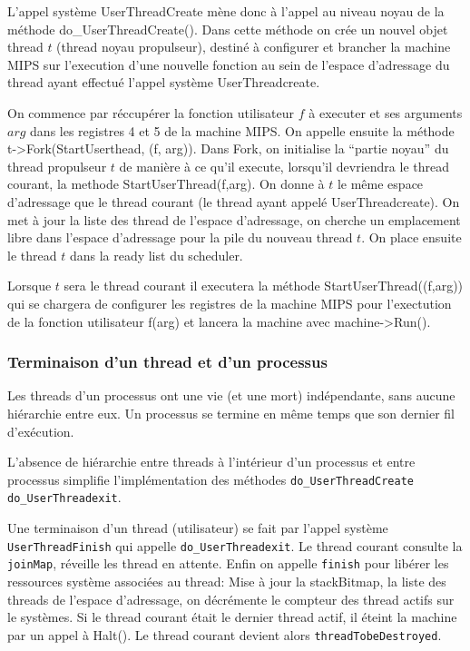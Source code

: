 \documentclass[11pt]{article}
\begin{document}
L'appel système UserThreadCreate mène donc à l'appel au niveau noyau de la méthode do_UserThreadCreate(). Dans cette méthode on crée un nouvel objet thread $t$ (thread noyau propulseur), destiné à configurer et brancher la machine MIPS sur l'execution d'une nouvelle fonction au sein de l'espace d'adressage du thread ayant effectué l'appel système UserThreadcreate.

On commence par réccupérer la fonction utilisateur $f$ à executer et ses arguments $arg$ dans les registres 4 et 5 de la machine MIPS.
On appelle ensuite la méthode t->Fork(StartUserthead, (f, arg)).
Dans Fork, on initialise la ``partie noyau'' du thread propulseur $t$ de manière
à ce qu'il execute, lorsqu'il devriendra le thread courant, la methode
StartUserThread(f,arg). On donne à $t$ le même espace d'adressage que le
thread courant (le thread ayant appelé UserThreadcreate). On met à jour
la liste des thread de l'espace d'adressage, on cherche un emplacement
libre dans l'espace d'adressage pour la pile du nouveau thread $t$.
On place ensuite le thread $t$ dans la ready list du scheduler.

Lorsque $t$ sera le thread courant il executera la méthode StartUserThread((f,arg))
qui se chargera de configurer les registres de la machine MIPS pour l'exectution
de la fonction utilisateur f(arg) et lancera la machine avec machine->Run(). 


\subsubsection{Terminaison d'un thread et d'un processus}
Les threads d'un processus ont une vie (et une mort) indépendante, sans aucune hiérarchie entre eux.
Un processus se termine en même temps que son dernier fil d'exécution.

L'absence de hiérarchie entre threads à l'intérieur d'un processus et entre processus simplifie
l'implémentation des méthodes \texttt{do\_UserThreadCreate} \texttt{do\_UserThreadexit}.

Une terminaison d'un thread (utilisateur) se fait par l'appel système \texttt{UserThreadFinish} qui appelle \texttt{do\_UserThreadexit}. Le thread courant consulte la \texttt{joinMap}, réveille les thread en attente. Enfin on appelle \texttt{finish} pour libérer les ressources système associées au thread:
Mise à jour la stackBitmap, la liste des threads de l'espace d'adressage, on décrémente le compteur des
thread actifs sur le systèmes. Si le thread courant était le dernier thread actif, il éteint la machine par un appel à Halt(). Le thread courant devient alors \texttt{threadTobeDestroyed}.
\end{document}
